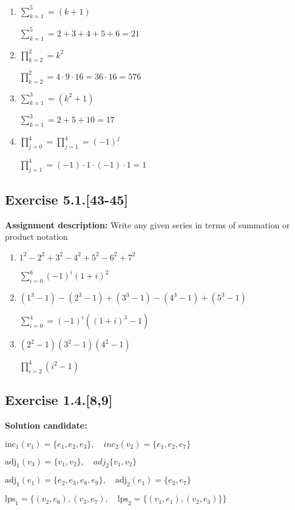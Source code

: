 \documentclass{report}
\newcommand{\cent}[1]{\begin{center}#1\end{center}}
\newcommand{\assignmentDescription}{\textbf{Assignment description: }}
\newcommand{\solution}{\textbf{Solution candidate: }}
\newcommand{\Exercise}[1]{\subsection{Exercise #1}}
\newcommand{\parenthesis}[1]{\left( #1 \right)}
\begin{document}
	\begin{enumerate}
		\item $\sum_{k=1}^{5} = (k+1)$
		
		\cent{$\sum_{k=1}^{5} = 2+3+4+5+6 = 21$}
		
		\item $\prod_{k=2}^{2} = k^2$
		
		\cent{$\prod_{k=2}^{2} = 4 \cdot 9 \cdot 16 = 36 \cdot 16 = 576$}
		
		\item $\sum_{k=1}^{3} = \parenthesis{k^2 + 1}$
		
		\cent{$\sum_{k=1}^{3} = 2 + 5 + 10 = 17$}
		
		\item $\prod_{j=0}^{4} = \prod_{j=1}^{4} = (-1)^j   $
		
		\cent{$\prod_{j=1}^{4} =  (-1) \cdot 1 \cdot  (-1) \cdot 1 = 1$}
		
	\end{enumerate}
	
	\Exercise{5.1.[43-45]}
	
	\assignmentDescription
	Write any given series in terms of summation or product notation
	
	\begin{enumerate}
		\item $1^2 - 2^2 + 3^2 - 4^2 + 5^2 - 6^2 + 7^2$
		
		\cent{$\sum_{i=0}^{6} (-1)^i (1+i)^2$}
		
		\item $(1^3-1)-(2^3-1)+(3^3-1)-(4^3 - 1) + (5^3 -1)$
		
		\cent{$\sum_{i=0}^{4} = (-1)^i \parenthesis{(1+i)^3 -1}$}
		
		\item $\parenthesis{2^2-1}\parenthesis{3^2 -1} \parenthesis{4^2 -1}$
		
		\cent{$\prod_{i=2}^{4} (i^2 -1)$}
		
	\end{enumerate}
	
	\Exercise{1.4.[8,9]}
	\solution
	\cent{$\text{inc}_1(v_1) = \{e_1,e_2,e_3\}, \quad inc_2(v_2) = \{e_1,e_2,e_7\}$}
	
	\cent{$\text{adj}_1(v_3) = \{v_1,v_2\}, \quad adj_2\{v_1,v_2\}$}
	
	\cent{$\text{adj}_1(e_1) = \{e_2,e_3,e_8,e_9\}, \quad \text{adj}_2(e_1) = \{e_2,e_7\}$}
	
	\cent{$\text{lps}_1 = \{(v_2,e_6),(v_3,e_7), \quad \text{lps}_2 = \{(v_1,e_1),(v_2,e_3)\}\}$}
	
\end{document}
